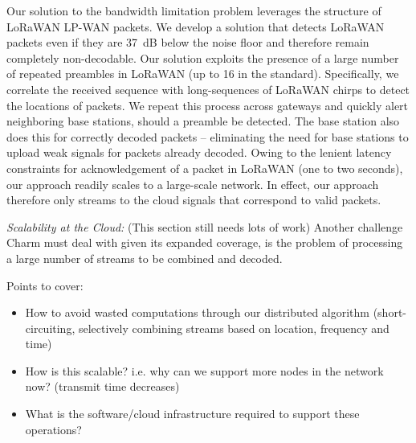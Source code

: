 Our solution to the bandwidth limitation problem leverages the structure of LoRaWAN LP-WAN packets. 
We develop a solution that detects LoRaWAN packets even if they are 37~dB below the noise floor and therefore remain completely non-decodable. 
Our solution exploits the presence of a large number of repeated preambles in LoRaWAN (up to 16 in the standard). 
Specifically, we correlate the received sequence with long-sequences of LoRaWAN chirps to detect the locations of packets. 
We repeat this process across gateways and quickly alert neighboring base stations, should a preamble be detected. 
The base station also does this for correctly decoded packets -- eliminating the need for base stations to upload weak signals for packets already decoded.  
Owing to the lenient latency constraints for acknowledgement of a packet in LoRaWAN (one to two seconds), our approach readily scales to a large-scale network. 
In effect, our approach therefore only streams to the cloud signals that correspond to valid packets. 

\textit{Scalability at the Cloud:} {\color{blue} (This section still needs lots of work)}
Another challenge Charm must deal with given its expanded coverage, is the problem of processing a large number of streams to be combined and decoded. 

{\color{blue} Points to cover:
\begin{itemize}
    \item How to avoid wasted computations through our distributed algorithm (short-circuiting, selectively combining streams based on location, frequency and time)
    \item How is this scalable? i.e. why can we support more nodes in the network now? (transmit time decreases)
    \item What is the software/cloud infrastructure required to support these operations?
\end{itemize}
}


